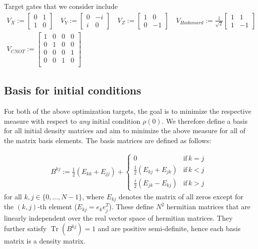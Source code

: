 \documentclass[letterpaper]{article}
\DeclareMathOperator{\Tr}{Tr}
\begin{document}
Target gates that we consider include
    \begin{align}
      V_{X} := \begin{bmatrix} 0 & 1 \\ 1 & 0  \end{bmatrix} \quad
      V_{Y} := \begin{bmatrix} 0 & -i \\ i & 0 \end{bmatrix} \quad
      V_{Z} := \begin{bmatrix} 1 & 0 \\ 0 & -1 \end{bmatrix} \quad 
      V_{Hadamard} := \frac{1}{\sqrt{2}} \begin{bmatrix} 1 & 1 \\ 1 & -1 \end{bmatrix} \\
      V_{CNOT} := \begin{bmatrix} 1  & 0 & 0 & 0 \\ 
                                   0  & 1 & 0 & 0 \\ 
                                   0  & 0 & 0 & 1 \\ 
                                   0  & 0 & 1 & 0 \\ 
                    \end{bmatrix}
    \end{align}



\subsection{Basis for initial conditions}
For both of the above optimization targets, the goal is to minimize the respective measure with respect to \textit{any} initial condition $\rho(0)$. We therefore define a basis for all initial density matrices and aim to minimize the above measure for all of the matrix basis elements. The basis matrices are defined as follows:

\begin{align}
B^{kj} := \frac 12 \left( E_{kk} + E_{jj}\right) +  \begin{cases} 
          0 & \text{if} \, k=j \\ 
        \frac 12 \left( E_{kj} + E_{jk}\right) & \text{if} \, k<j \\
        \frac i2 \left( E_{jk} - E_{kj}\right) & \text{if} \, k>j
      \end{cases} 
\end{align}
for all $k,j\in\{0,\dots, N-1\}$, where $E_{kj}$ denotes the matrix of all zeros except for the $(k,j)$-th element ($E_{kj} = e_ke_j^T$). These define $N^2$ hermitian matrices that are linearly independent over the real vector space of hermitian matrices. They further satisfy $\Tr(B^{kj}) = 1$ and are positive semi-definite, hence each basis matrix is a density matrix. 
\end{document}
